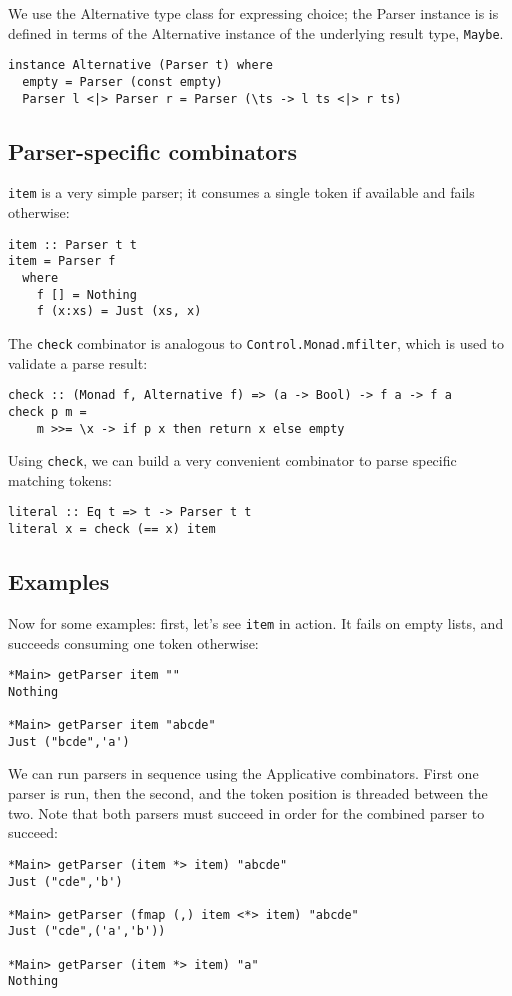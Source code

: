 \documentclass{tmr}
\begin{document}
We use the Alternative type class for expressing choice; the Parser instance is
is defined in terms of the Alternative instance of the
underlying result type, \verb+Maybe+.
\begin{verbatim}
instance Alternative (Parser t) where
  empty = Parser (const empty)
  Parser l <|> Parser r = Parser (\ts -> l ts <|> r ts)
\end{verbatim}

\subsection{Parser-specific combinators}
\verb+item+ is a very simple parser; it 
consumes a single token if available and fails otherwise:
\begin{verbatim}
item :: Parser t t
item = Parser f
  where 
    f [] = Nothing
    f (x:xs) = Just (xs, x)
\end{verbatim}

The \verb+check+ combinator is analogous to \verb+Control.Monad.mfilter+, which is used to
validate a parse result:
\begin{verbatim}
check :: (Monad f, Alternative f) => (a -> Bool) -> f a -> f a
check p m =
    m >>= \x -> if p x then return x else empty
\end{verbatim}

Using \verb+check+, we can build a very convenient combinator to parse specific
matching tokens: 
\begin{verbatim}
literal :: Eq t => t -> Parser t t
literal x = check (== x) item
\end{verbatim}

\subsection{Examples}
Now for some examples:  first, let's see \verb+item+ in action.  It fails on empty lists,
and succeeds consuming one token otherwise:
\begin{verbatim}
*Main> getParser item ""
Nothing

*Main> getParser item "abcde"
Just ("bcde",'a')
\end{verbatim}

We can run parsers in sequence using the Applicative combinators.  First one parser
is run, then the second, and the token position is threaded between the two.
Note that both parsers must succeed in order for the combined parser to succeed:
\begin{verbatim}
*Main> getParser (item *> item) "abcde"
Just ("cde",'b')

*Main> getParser (fmap (,) item <*> item) "abcde"
Just ("cde",('a','b'))

*Main> getParser (item *> item) "a"
Nothing
\end{verbatim}
\end{document}

